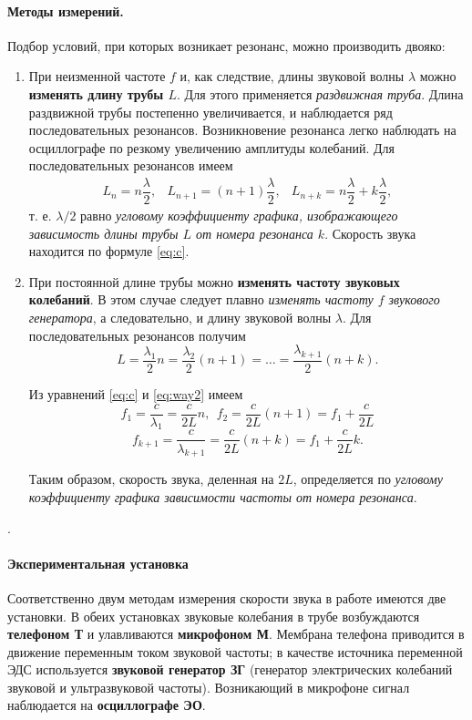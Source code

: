 \documentclass[12pt]{article}
\begin{document}
			\paragraph{Методы измерений.}Подбор условий, при которых возникает резонанс, можно производить двояко:
			\begin{enumerate}
				\item При неизменной частоте $f$ и, как следствие, длины звуковой волны $\lambda$ можно \textbf{изменять длину трубы $L$}. Для этого применяется \textit{раздвижная труба}. Длина раздвижной трубы постепенно увеличивается, и наблюдается ряд последовательных резонансов. Возникновение резонанса легко наблюдать на осциллографе по резкому увеличению амплитуды
				колебаний. Для последовательных резонансов имеем
				\begin{eqnarray}
				L_n=n\dfrac{\lambda}{2}, & 	L_{n+1}=(n+1)\dfrac{\lambda}{2}, &L_{n+k} = n\dfrac{\lambda}{2} + k\dfrac{\lambda}{2},
				\end{eqnarray}	
				т. е. $\lambda/2$ равно \textit{угловому коэффициенту графика, изображающего зависимость длины трубы
				$L$ от номера резонанса	$k$}. Скорость звука	находится по формуле \ref{eq:c}.
				\item При постоянной длине трубы можно \textbf{изменять частоту звуковых
				колебаний}. В этом случае следует плавно \textit{изменять частоту $f$
				звукового генератора}, а следовательно, и длину звуковой волны $\lambda$. Для последовательных резонансов получим
				\begin{equation}\label{eq:way2}
					L=\dfrac{\lambda_1}{2}n=\dfrac{\lambda_2}{2}(n+1)=\dots=\dfrac{\lambda_{k+1}}{2}(n+k).
				\end{equation}	
				
				Из уравнений \ref{eq:c} и \ref{eq:way2} имеем
				\begin{equation*}
					f_1=\dfrac{c}{\lambda_1} = \dfrac{c}{2L}n, \ \ f_2=\dfrac{c}{2L}(n+1)=f_1 + \dfrac{c}{2L}
				\end{equation*}
				\begin{equation}
					f_{k+1} = \dfrac{c}{\lambda_{k+1}} = \dfrac{c}{2L}(n+k)=f_1+\dfrac{c}{2L}k.
				\end{equation}
	
			Таким образом, скорость звука, деленная на $2L$, определяется по \textit{угловому коэффициенту графика зависимости частоты от номера резонанса}.
		\end{enumerate}.
		\paragraph{Экспериментальная установка\\}
		Соответственно двум методам измерения скорости звука в работе имеются две установки. В обеих установках звуковые колебания в трубе возбуждаются \textbf{телефоном Т} и улавливаются \textbf{микрофоном М}. Мембрана телефона приводится в движение переменным током звуковой частоты; в качестве источника переменной ЭДС используется \textbf{звуковой генератор ЗГ} (генератор электрических колебаний звуковой и ультразвуковой частоты). Возникающий в микрофоне сигнал наблюдается на \textbf{осциллографе ЭО}.
	
\end{document}
